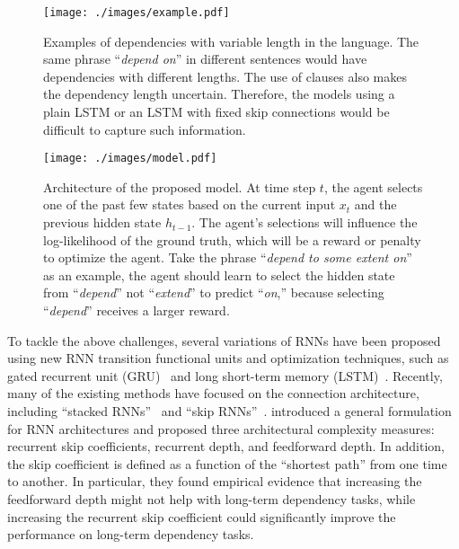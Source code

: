 \documentclass[letterpaper]{article} \usepackage{aaai19}  \usepackage{times}  \usepackage{helvet}  \usepackage{courier}  \usepackage{url}  \usepackage{graphicx}  \usepackage{amsmath}
\begin{document}
\begin{figure}[t]
\centering
  \texttt{[image: ./images/example.pdf]}
  \caption{Examples of dependencies with variable length in the language. The same phrase ``\textit{depend on}'' in different sentences would have dependencies with different lengths. The use of clauses also makes the dependency length uncertain. Therefore, the models using a plain LSTM or an LSTM with fixed skip connections would be difficult to capture such information.} \label{fig:example}
\end{figure}

\begin{figure*}[t!]
\centering
\texttt{[image: ./images/model.pdf]}
\caption{Architecture of the proposed model. At time step $t$, the agent selects one of the past few states based on the current input $x_t$ and the previous hidden state $h_{t-1}$. The agent's selections will influence the log-likelihood of the ground truth, which will be a reward or penalty to optimize the agent. Take the phrase ``\textit{depend to some extent  on}'' as an example, the agent should learn to select the hidden state from ``\textit{depend}'' not ``\textit{extend}'' to predict ``\textit{on},'' because selecting ``\textit{depend}'' receives a larger reward.} \label{fig:model}
\end{figure*}

To tackle the above challenges, several variations of RNNs have been proposed using new RNN transition functional units and optimization techniques, such as gated recurrent unit (GRU)~\cite{chung2014empirical} and long short-term memory (LSTM)~\cite{hochreiter1997long}. Recently, many of the existing methods have focused on the connection architecture, including ``stacked RNNs''~\cite{el1996hierarchical} and ``skip RNNs''~\cite{chang2017dilated}. \citeauthor{zhang2016architectural}  introduced a general formulation for RNN architectures and proposed three architectural complexity measures: recurrent skip coefficients, recurrent depth, and feedforward depth. In addition, the skip coefficient is defined as a function of the “shortest path” from one time to another. In particular, they found empirical evidence that increasing the feedforward depth might not help with long-term dependency tasks, while increasing the recurrent skip coefficient could significantly improve the performance on long-term dependency tasks.
\end{document}
